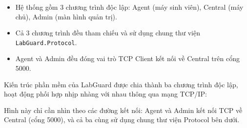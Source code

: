 \documentclass[12pt,a4paper]{article}
\begin{document}
\begin{summarybox}
\begin{itemize}[leftmargin=1.5em, itemsep=1pt]
  \item Hệ thống gồm 3 chương trình độc lập: Agent (máy sinh viên), Central (máy chủ), Admin (màn hình quản trị).
  \item Cả 3 chương trình đều tham chiếu và sử dụng chung thư viện \texttt{LabGuard.Protocol}.
  \item Agent và Admin đều đóng vai trò TCP Client kết nối về Central trên cổng 5000.
\end{itemize}
\end{summarybox}

Kiến trúc phần mềm của LabGuard được chia thành ba chương trình độc lập, hoạt động phối hợp nhịp nhàng với nhau thông qua mạng TCP/IP:

Hình này chỉ cần nhìn theo các đường kết nối: Agent và Admin kết nối TCP về Central (cổng 5000), và cả ba cùng sử dụng chung thư viện Protocol bên dưới.
\end{document}
